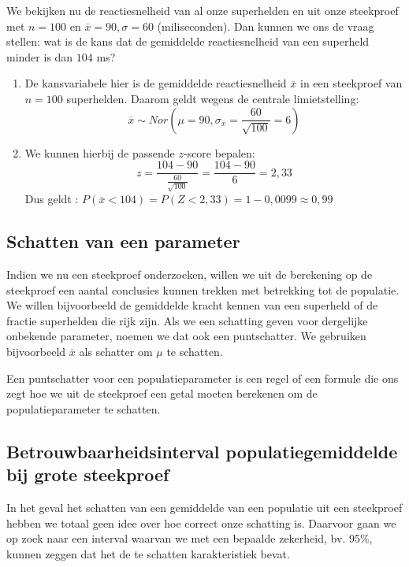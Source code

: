 \begin{example}
  We bekijken nu de reactiesnelheid van al onze superhelden en uit onze steekproef met $n = 100$ en $\overline{x} = 90, \sigma = 60$ (miliseconden). Dan kunnen we ons de vraag stellen: wat is de kans dat de gemiddelde reactiesnelheid van een superheld minder is dan $104$ ms?


  \begin{enumerate}
    \item De kansvariabele hier is de gemiddelde reactiesnelheid $\overline{x}$ in een steekproef van $n=100$ superhelden. Daarom geldt wegens de centrale limietstelling:
    \[ \overline{x} \sim Nor(\mu = 90, \sigma_{\overline{x}} = \frac{60}{\sqrt{100}} = 6) \]
    \item We kunnen hierbij de passende $z$-score bepalen:
    \[ z = \frac{104-90}{\frac{60}{\sqrt{100}}} = \frac{104-90}{6} = 2,33 \]
    Dus geldt : $P(\overline{x} < 104) = P(Z < 2,33) = 1 - 0,0099 \approx 0,99$
  \end{enumerate}
\end{example}

\subsection{Schatten van een parameter}

Indien we nu een steekproef onderzoeken, willen we uit de berekening op de steekproef een aantal conclusies kunnen trekken met betrekking tot de populatie. We willen bijvoorbeeld de gemiddelde kracht kennen van een superheld of de fractie superhelden die rijk zijn. Als we een schatting geven voor dergelijke onbekende parameter, noemen we dat ook een puntschatter. We gebruiken bijvoorbeeld $\overline{x}$ als schatter om $\mu$ te schatten.

\begin{definition}[puntschatter]
  Een puntschatter voor een populatieparameter is een regel of een formule die ons zegt hoe we uit de steekproef een getal moeten berekenen om de populatieparameter te schatten.
\end{definition}

\subsection{Betrouwbaarheidsinterval populatiegemiddelde bij grote steekproef}
\label{ssec:betrouwbaarheidsinterval-grote-steekproef}

In het geval het schatten van een gemiddelde van een populatie uit een steekproef hebben we totaal geen idee over hoe correct onze schatting is. Daarvoor gaan we op zoek naar een interval waarvan we met een bepaalde zekerheid, bv. 95\%, kunnen zeggen dat het de te schatten karakteristiek bevat.

